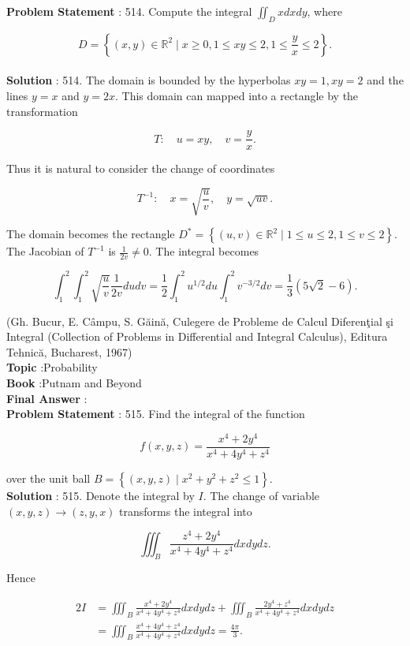 \documentclass[10pt]{article}
\begin{document}
\textbf{Problem Statement} :
514. Compute the integral $\iint_{D} x d x d y$, where

$$
D=\left\{(x, y) \in \mathbb{R}^{2} \mid x \geq 0,1 \leq x y \leq 2,1 \leq \frac{y}{x} \leq 2\right\} .
$$
\\
\textbf{Solution} :
514. The domain is bounded by the hyperbolas $x y=1, x y=2$ and the lines $y=x$ and $y=2 x$. This domain can mapped into a rectangle by the transformation

$$
T: \quad u=x y, \quad v=\frac{y}{x} .
$$

Thus it is natural to consider the change of coordinates

$$
T^{-1}: \quad x=\sqrt{\frac{u}{v}}, \quad y=\sqrt{u v} .
$$

The domain becomes the rectangle $D^{*}=\left\{(u, v) \in \mathbb{R}^{2} \mid 1 \leq u \leq 2,1 \leq v \leq 2\right\}$. The Jacobian of $T^{-1}$ is $\frac{1}{2 v} \neq 0$. The integral becomes

$$
\int_{1}^{2} \int_{1}^{2} \sqrt{\frac{u}{v}} \frac{1}{2 v} d u d v=\frac{1}{2} \int_{1}^{2} u^{1 / 2} d u \int_{1}^{2} v^{-3 / 2} d v=\frac{1}{3}(5 \sqrt{2}-6) .
$$

(Gh. Bucur, E. Câmpu, S. Găină, Culegere de Probleme de Calcul Diferenţial şi Integral (Collection of Problems in Differential and Integral Calculus), Editura Tehnică, Bucharest, 1967)
\\
\textbf{Topic} :Probability\\
\textbf{Book} :Putnam and Beyond\\
\textbf{Final Answer} :\\


\textbf{Problem Statement} :
515. Find the integral of the function

$$
f(x, y, z)=\frac{x^{4}+2 y^{4}}{x^{4}+4 y^{4}+z^{4}}
$$

over the unit ball $B=\left\{(x, y, z) \mid x^{2}+y^{2}+z^{2} \leq 1\right\}$.
\\
\textbf{Solution} :
515. Denote the integral by $I$. The change of variable $(x, y, z) \rightarrow(z, y, x)$ transforms the integral into

$$
\iiint_{B} \frac{z^{4}+2 y^{4}}{x^{4}+4 y^{4}+z^{4}} d x d y d z .
$$

Hence

$$
\begin{aligned}
2 I &=\iiint_{B} \frac{x^{4}+2 y^{4}}{x^{4}+4 y^{4}+z^{4}} d x d y d z+\iiint_{B} \frac{2 y^{4}+z^{4}}{x^{4}+4 y^{4}+z^{4}} d x d y d z \\
&=\iiint_{B} \frac{x^{4}+4 y^{4}+z^{4}}{x^{4}+4 y^{4}+z^{4}} d x d y d z=\frac{4 \pi}{3} .
\end{aligned}
$$
\end{document}
